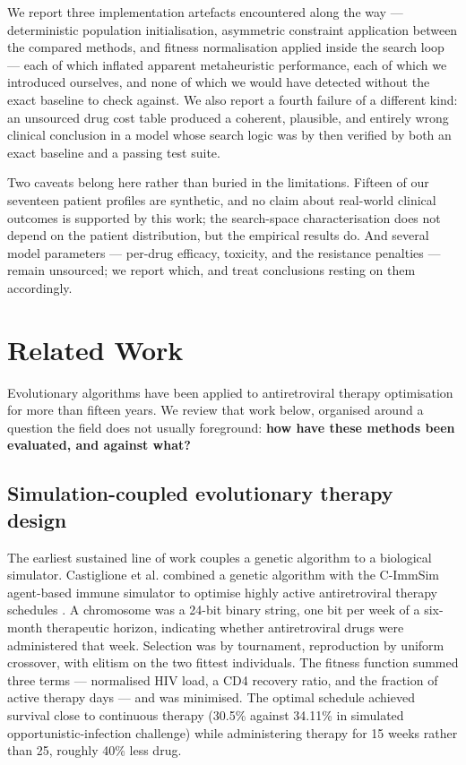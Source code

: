 \documentclass[conference]{IEEEtran}
\begin{document}
We report three implementation artefacts encountered along the way --- deterministic population initialisation, asymmetric constraint application between the compared methods, and fitness normalisation applied inside the search loop --- each of which inflated apparent metaheuristic performance, each of which we introduced ourselves, and none of which we would have detected without the exact baseline to check against. We also report a fourth failure of a different kind: an unsourced drug cost table produced a coherent, plausible, and entirely wrong clinical conclusion in a model whose search logic was by then verified by both an exact baseline and a passing test suite.

Two caveats belong here rather than buried in the limitations. Fifteen of our seventeen patient profiles are synthetic, and no claim about real-world clinical outcomes is supported by this work; the search-space characterisation does not depend on the patient distribution, but the empirical results do. And several model parameters --- per-drug efficacy, toxicity, and the resistance penalties --- remain unsourced; we report which, and treat conclusions resting on them accordingly.

\section{Related Work}\label{sec:related}

Evolutionary algorithms have been applied to antiretroviral therapy optimisation for more than fifteen years. We review that work below, organised around a question the field does not usually foreground: \textbf{how have these methods been evaluated, and against what?}

\subsection{Simulation-coupled evolutionary therapy design}\label{sec:rw-sim}

The earliest sustained line of work couples a genetic algorithm to a biological simulator. Castiglione et al. combined a genetic algorithm with the C-ImmSim agent-based immune simulator to optimise highly active antiretroviral therapy schedules \cite{castiglione2007}. A chromosome was a 24-bit binary string, one bit per week of a six-month therapeutic horizon, indicating whether antiretroviral drugs were administered that week. Selection was by tournament, reproduction by uniform crossover, with elitism on the two fittest individuals. The fitness function summed three terms --- normalised HIV load, a CD4 recovery ratio, and the fraction of active therapy days --- and was minimised. The optimal schedule achieved survival close to continuous therapy (30.5\% against 34.11\% in simulated opportunistic-infection challenge) while administering therapy for 15 weeks rather than 25, roughly 40\% less drug.
\end{document}
